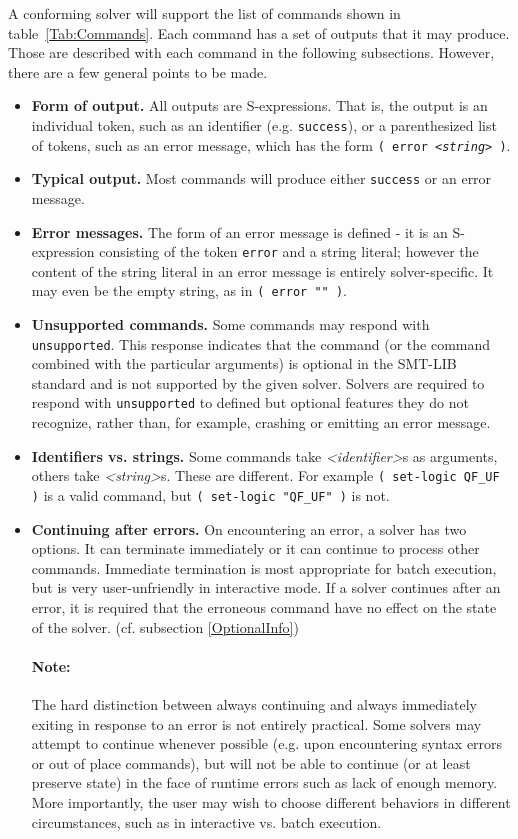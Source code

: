 \documentclass[12pt,oneside]{report}
\newcommand{\ID}{{\it <identifier>}}
\newcommand{\strng}{{\it <string>}} %
\begin{document}
A conforming solver will support the list of commands shown in table~\ref{Tab:Commands}.
Each command has a set of outputs that it may produce.  Those are described with each command in the following subsections.  
However, there are a few general points to be made.
\begin{itemize}
\item {\bf Form of output.} All outputs are S-expressions. That is, the output is an individual token, such as an identifier (e.g. {\tt success}), or a parenthesized list of tokens, such as an error message, which has the form {\tt ( error \strng\ )}.
\item {\bf Typical output.} Most commands will produce either {\tt success} or an error message.
\item {\bf Error messages.} The form of an error message is defined - it is an S-expression consisting of the token {\tt error} and a string literal; however the content of the string literal in an error message
is entirely solver-specific.  It may even be the empty string, as in {\tt ( error "" )}.
\item {\bf Unsupported commands.} Some commands may respond with {\tt unsupported}.  This response indicates that the command (or the command combined with the particular arguments) is optional in the SMT-LIB standard and is not supported
by the given solver. Solvers are required to respond with {\tt unsupported} to defined but optional features they do not recognize, rather than, for example, crashing or emitting an error message.
\item {\bf Identifiers vs. strings.} Some commands take \ID s as arguments, others take \strng s.  These are different.  For example {\tt ( set-logic QF\_UF )} is a valid command, but {\tt ( set-logic "QF\_UF" )} is not.
\item {\bf Continuing after errors.} On encountering an error, a solver has two options.  It can terminate immediately or it can continue to process other commands.  Immediate termination is most appropriate for batch execution, but is very user-unfriendly in interactive mode.  If a solver continues after an error, it is required that the erroneous command have no effect on the
state of the solver. (cf. subsection \ref{OptionalInfo})
\paragraph{Note:} The hard distinction between always continuing and always immediately exiting in response to an error is not entirely practical. Some solvers may attempt to continue whenever possible (e.g. upon encountering syntax errors or out of place commands), but will not be able to continue (or at least preserve state) in the face of runtime errors such as lack of enough memory. More importantly, the user may
wish to choose different behaviors in different circumstances, such as in interactive vs. batch execution.


\end{itemize}
\end{document}
